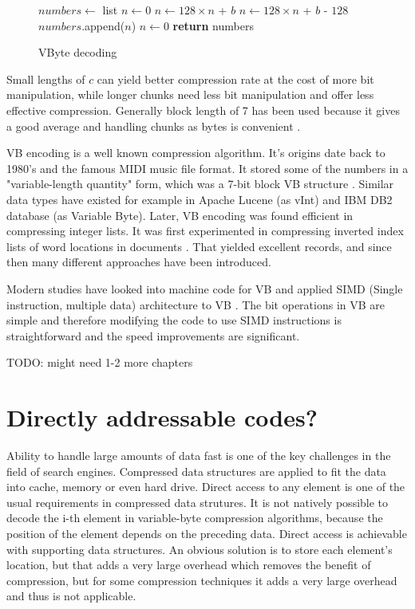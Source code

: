 \begin{figure}[ht]
\begin{algorithmic}
\State $numbers\gets $ list
\State $n\gets 0$
\State $n\gets 128\times n $ + $b$
\Else
\State $n\gets 128\times n $ + $b$ - $128$
\State $numbers$.append($n$)
\State $n\gets 0$
\EndIf
\EndFor
\State \textbf{return} numbers
\EndFunction
\end{algorithmic}
\caption{VByte decoding} \label{vbyte_dec}
\end{figure}

Small lengths of $c$ can yield better compression rate at the cost of more bit manipulation, while longer chunks need less bit manipulation and 
offer less effective compression. Generally block length of 7 has been used because it gives a good average and handling chunks as bytes is 
convenient \citep{Man08}.

VB encoding is a well known compression algorithm. It's origins date back to 1980's and the famous MIDI music file format. It stored some of the numbers
in a "variable-length quantity" form, which was a 7-bit block VB structure \citep{Mid96}. Similar data types have existed for example in Apache Lucene 
(as vInt) and IBM DB2 database (as Variable Byte). Later, VB encoding was found efficient in compressing integer lists. It was first experimented in 
compressing inverted index lists of word locations in documents \citep{Sch02}. That yielded excellent records, and since then many different approaches 
have been introduced. 

Modern studies have looked into machine code for VB and applied SIMD (Single instruction, multiple data) architecture to VB \citep{Lem18,Pla15}. The bit 
operations in VB are simple and therefore modifying the code to use SIMD instructions is straightforward and the speed improvements are significant. 

TODO: might need 1-2 more chapters


\chapter{Directly addressable codes?}

Ability to handle large amounts of data fast is one of the key challenges in the field of search engines. Compressed data structures are applied to fit the 
data into cache, memory or even hard drive. Direct access to any element is one of the usual requirements in compressed data strutures. It is not natively
possible to decode the i-th element in variable-byte compression algorithms, because the position of the element depends on the preceding data. Direct access 
is achievable with supporting data structures. An obvious solution is to store each element's location, but that adds a very large overhead which removes the 
benefit of compression, but for some compression techniques it adds a very large overhead and thus is not applicable.

